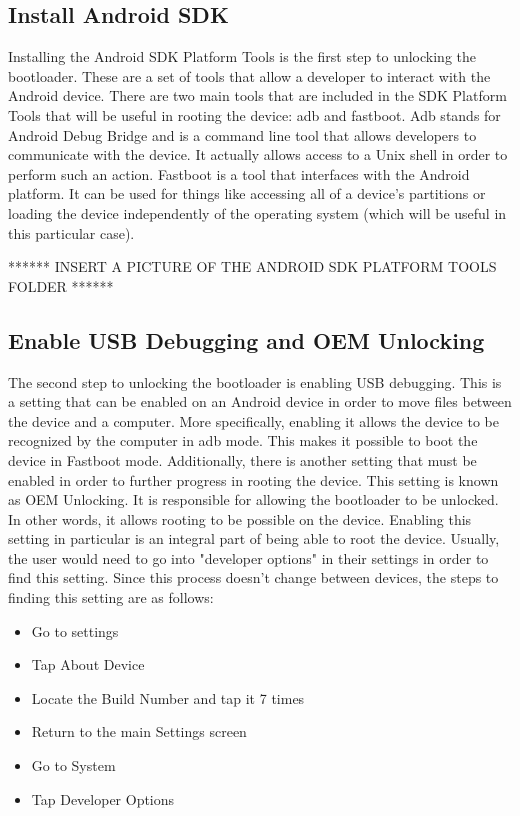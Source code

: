 \subsection{Install Android SDK}
Installing the Android SDK Platform Tools is the first step to unlocking the bootloader. These are a set of tools that allow a developer to interact with the Android device.
There are two main tools that are included in the SDK Platform Tools that will be useful in rooting the device: adb and fastboot. Adb stands for Android Debug Bridge and is 
a command line tool that allows developers to communicate with the device. It actually allows access to a Unix shell in order to perform such an action. Fastboot is a tool that 
interfaces with the Android platform. It can be used for things like accessing all of a device's partitions or loading the device independently of the operating system 
(which will be useful in this particular case).

****** INSERT A PICTURE OF THE ANDROID SDK PLATFORM TOOLS FOLDER ******

\subsection{Enable USB Debugging and OEM Unlocking}
The second step to unlocking the bootloader is enabling USB debugging. This is a setting that can be enabled on an Android device in order to move files between the device 
and a computer. More specifically, enabling it allows the device to be recognized by the computer in adb mode. This makes it possible to boot the device in Fastboot mode. 
Additionally, there is another setting that must be enabled in order to further progress in rooting the device. This setting is known as OEM Unlocking. It is 
responsible for allowing the bootloader to be unlocked. In other words, it allows rooting to be possible on the device. Enabling this setting in particular is an integral
part of being able to root the device. Usually, the user would need to go into "developer options" in their settings in order to find this setting. Since this process 
doesn't change between devices, the steps to finding this setting are as follows: 

\begin{itemize}

\item Go to settings
\item Tap About Device
\item Locate the Build Number and tap it 7 times
\item Return to the main Settings screen
\item Go to System
\item Tap Developer Options

\end{itemize}

